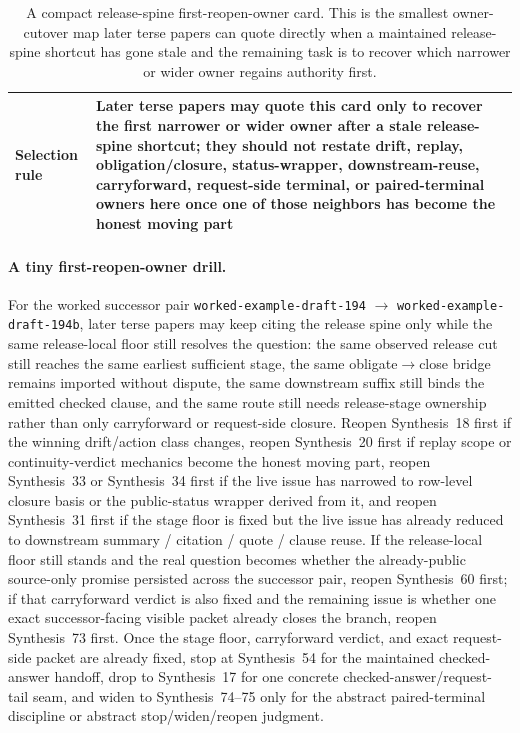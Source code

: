 \documentclass[11pt]{article}
\begin{document}
\begin{table}[t]
\begin{tabularx}{\linewidth}{@{}lX@{}}
Selection rule & Later terse papers may quote this card only to recover the first narrower or wider owner after a stale release-spine shortcut; they should not restate drift, replay, obligation/closure, status-wrapper, downstream-reuse, carryforward, request-side terminal, or paired-terminal owners here once one of those neighbors has become the honest moving part \\
\bottomrule
\end{tabularx}
\caption{A compact release-spine first-reopen-owner card. This is the smallest owner-cutover map later terse papers can quote directly when a maintained release-spine shortcut has gone stale and the remaining task is to recover which narrower or wider owner regains authority first.}
\label{tab:release-spine-first-reopen-owner-card}
\end{table}

\paragraph{A tiny first-reopen-owner drill.} For the worked successor pair \texttt{worked-example-draft-194} $\to$ \texttt{worked-example-draft-194b}, later terse papers may keep citing the release spine only while the same release-local floor still resolves the question: the same observed release cut still reaches the same earliest sufficient stage, the same obligate$\to$close bridge remains imported without dispute, the same downstream suffix still binds the emitted checked clause, and the same route still needs release-stage ownership rather than only carryforward or request-side closure. Reopen Synthesis~18 first if the winning drift/action class changes, reopen Synthesis~20 first if replay scope or continuity-verdict mechanics become the honest moving part, reopen Synthesis~33 or Synthesis~34 first if the live issue has narrowed to row-level closure basis or the public-status wrapper derived from it, and reopen Synthesis~31 first if the stage floor is fixed but the live issue has already reduced to downstream summary / citation / quote / clause reuse. If the release-local floor still stands and the real question becomes whether the already-public source-only promise persisted across the successor pair, reopen Synthesis~60 first; if that carryforward verdict is also fixed and the remaining issue is whether one exact successor-facing visible packet already closes the branch, reopen Synthesis~73 first. Once the stage floor, carryforward verdict, and exact request-side packet are already fixed, stop at Synthesis~54 for the maintained checked-answer handoff, drop to Synthesis~17 for one concrete checked-answer/request-tail seam, and widen to Synthesis~74--75 only for the abstract paired-terminal discipline or abstract stop/widen/reopen judgment.\cite{series:workedexample,series:planstateequiv,series:auditorreplay,series:releaseclosure,series:statusenvelopes,series:downstreamnormalforms,series:publicrequestcarryforward,series:publicrequestresponsepacketrefreshresponsepacketclosureverdicts,series:challengeanswerreviewmenus,series:pairedterminalcitationdiscipline,series:pairedterminalcutoverrules}
\end{document}
